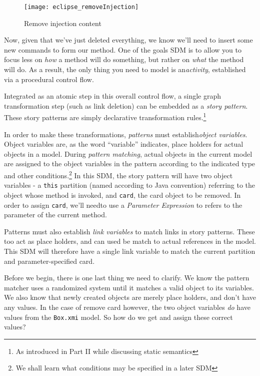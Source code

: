 \newpage

\begin{figure}[htbp]
	\centering
    \texttt{[image: eclipse\_removeInjection]}
	\caption{Remove injection content}
	\label{fig:delete_injection}
\end{figure}

\vspace{1cm}

Now, given that we've just deleted everything, we know we'll need to insert some new commands to form our method. One of the goals SDM is to allow you to
focus less on \emph{how} a method will do something, but rather on \emph{what} the method will do. As a result, the only thing you need to model is
an\emph{activity}, established via a procedural control flow. 

Integrated as an atomic step in this overall control flow, a single graph transformation step (such as link deletion) can be embedded as
a \emph{story pattern}. These story patterns are simply declarative transformation rules.\footnote{As introduced in Part II while
discussing static semantics}

In order to make these transformations, \emph{patterns} must establish\emph{object variables}. Object variables are, as
the word ``variable'' indicates, place holders for actual objects in a model.  During \emph{pattern matching}, actual objects in the 
current model are assigned to the object variables in the pattern according to the indicated type and other conditions.\footnote{We shall
learn what conditions may be specified in a later SDM} In this SDM, the story pattern will have two object variables - a \texttt{this} partition (named
according to Java convention) referring to the object whose method is invoked, and \texttt{card}, the card object to be removed. In order to assign
\texttt{card}, we'll needto use a \emph{Parameter Expression} to refers to the parameter of the current method.

Patterns must also establish \emph{link variables} to match links in story patterns. These too act as place holders, and
can used be match to actual references in the model. This SDM will therefore have a single link variable to match the current partition and parameter-specified
card.

Before we begin, there is one last thing we need to clarify. We know the pattern matcher uses a randomized system until it matches a valid object to its
variables. We also know that newly created objects are merely place holders, and don't have any values. In the case of remove card however, the two object
variables \emph{do} have values from the \texttt{Box.xmi} model. So how do we get and assign these correct values?

